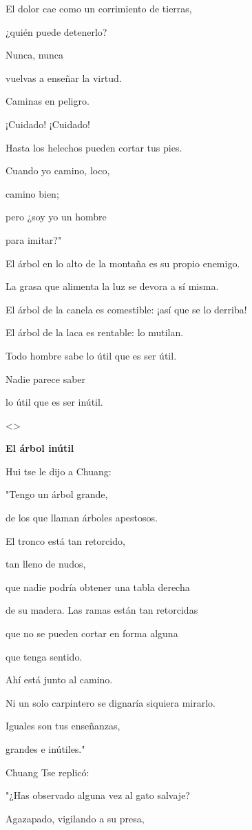 El dolor cae como un corrimiento de tierras,

¿quién puede detenerlo?

Nunca, nunca

vuelvas a enseñar la virtud.

Caminas en peligro.

¡Cuidado! ¡Cuidado!

Hasta los helechos pueden cortar tus pies.

Cuando yo camino, loco,

camino bien;

pero ¿soy yo un hombre

para imitar?"

El árbol en lo alto de la montaña es su propio enemigo.

La grasa que alimenta la luz se devora a sí misma.

El árbol de la canela es comestible: ¡así que se lo derriba!

El árbol de la laca es rentable: lo mutilan.

Todo hombre sabe lo útil que es ser útil.

Nadie parece saber

lo útil que es ser inútil.

\textless\textgreater{}

\textbf{{El árbol inútil}}

Hui tse le dijo a Chuang:

"Tengo un árbol grande,

de los que llaman árboles apestosos.

El tronco está tan retorcido,

tan lleno de nudos,

que nadie podría obtener una tabla derecha

de su madera. Las ramas están tan retorcidas

que no se pueden cortar en forma alguna

que tenga sentido.

Ahí está junto al camino.

Ni un solo carpintero se dignaría siquiera mirarlo.

Iguales son tus enseñanzas,

grandes e inútiles."

Chuang Tse replicó:

"¿Has observado alguna vez al gato salvaje?

Agazapado, vigilando a su presa,

